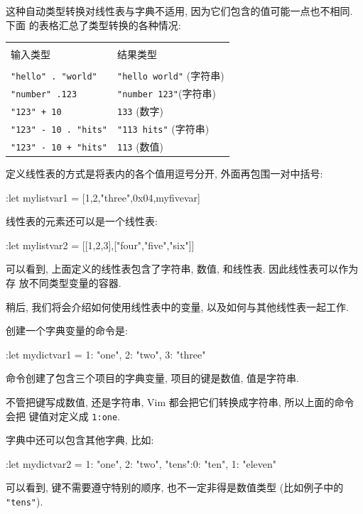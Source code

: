 这种自动类型转换对线性表与字典不适用, 因为它们包含的值可能一点也不相同. 下面
的表格汇总了类型转换的各种情况:
\begin{center}
    \begin{tabular}{ll}
        \hline \\
        输入类型 & 结果类型 \\
        \hline \\
        \texttt{"hello" . "world"}  & \texttt{"hello world"} (字符串) \\
        \texttt{"number" .123}  & \texttt{"number 123"}(字符串) \\
        \texttt{"123" + 10} & \texttt{133} (数字) \\
        \texttt{"123" - 10 . "hits"} & \texttt{"113 hits"} (字符串) \\
        \texttt{"123" - 10 + "hits"} & \texttt{113} (数值) \\
        \hline
    \end{tabular}
\end{center}

定义线性表的方式是将表内的各个值用逗号分开, 外面再包围一对中括号:
\begin{vimcode}
:let mylistvar1 = [1,2,"three",0x04,myfivevar]
\end{vimcode}
线性表的元素还可以是一个线性表:
\begin{vimcode}
    :let mylistvar2 = [[1,2,3],["four","five","six"]]
\end{vimcode}

可以看到, 上面定义的线性表包含了字符串, 数值, 和线性表. 因此线性表可以作为存
放不同类型变量的容器.

稍后, 我们将会介绍如何使用线性表中的变量, 以及如何与其他线性表一起工作.

创建一个字典变量的命令是:
\begin{vimcode}
:let mydictvar1 = {1: "one", 2: "two", 3: "three"}
\end{vimcode}
命令创建了包含三个项目的字典变量, 项目的键是数值, 值是字符串.

不管把键写成数值, 还是字符串, Vim 都会把它们转换成字符串, 所以上面的命令会把
键值对定义成 \texttt{1:one}.

字典中还可以包含其他字典, 比如:
\begin{vimcode}
:let mydictvar2 = {1: "one", 2: "two", "tens":{0: "ten", 1: "eleven"}}
\end{vimcode}
可以看到, 键不需要遵守特别的顺序, 也不一定非得是数值类型 (比如例子中的
\texttt{"tens"}).

